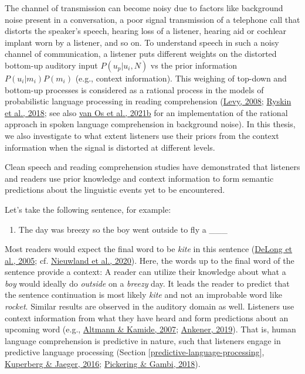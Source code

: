 \documentclass[a4paper, nobind]{templates/ociamthesis}
\providecommand{\tightlist}{%
  \setlength{\itemsep}{0pt}\setlength{\parskip}{0pt}}
\begin{document}
The channel of transmission can become noisy due to factors like background noise present in a conversation,
a poor signal transmission of a telephone call that distorts the speaker's speech,
hearing loss of a listener,
hearing aid or cochlear implant worn by a listener, and so on.
To understand speech in such a noisy channel of communication, a listener puts different weights on the distorted bottom-up auditory input \(P(u_p|u_i, N)\) vs the prior information \(P(u_i|m_i)P(m_i)\) (e.g., context information).
This weighing of top-down and bottom-up processes is considered as a rational process in the models of probabilistic language processing in reading comprehension (\protect\hyperlink{ref-Levy2008}{Levy, 2008}; \protect\hyperlink{ref-Ryskin2018}{Ryskin et al., 2018}; see also \protect\hyperlink{ref-vanOs2021}{van Os et al., 2021b} for an implementation of the rational approach in spoken language comprehension in background noise).
In this thesis, we also investigate to what extent listeners use their priors from the context information when the signal is distorted at different levels.

Clean speech and reading comprehension studies have demonstrated that listeners and readers use prior knowledge and context information to form semantic predictions about the linguistic events yet to be encountered.

Let's take the following sentence, for example:

\begin{enumerate}
\def\labelenumi{(\arabic{enumi})}
\tightlist
\item
  The day was breezy so the boy went outside to fly a \_\_\_\label{kite}
\end{enumerate}

Most readers would expect the final word to be \emph{kite} in this sentence (\protect\hyperlink{ref-Delong2005}{DeLong et al., 2005}; cf. \protect\hyperlink{ref-Nieuwland2020a}{Nieuwland et al., 2020}). Here, the words up to the final word of the sentence provide a context:
A reader can utilize their knowledge about what a \emph{boy} would ideally do \emph{outside} on a \emph{breezy} day.
It leads the reader to predict that the sentence continuation is most likely \emph{kite} and not an improbable word like \emph{rocket}.
Similar results are observed in the auditory domain as well.
Listeners use context information from what they have heard and form predictions about an upcoming word (e.g., \protect\hyperlink{ref-Altmann2007}{Altmann \& Kamide, 2007}; \protect\hyperlink{ref-Ankener2019}{Ankener, 2019}).
That is, human language comprehension is predictive in nature, such that listeners engage in predictive language processing (Section \ref{predictive-language-processing}, \protect\hyperlink{ref-Kuperberg2016}{Kuperberg \& Jaeger, 2016}; \protect\hyperlink{ref-Pickering2018}{Pickering \& Gambi, 2018}).
\end{document}
